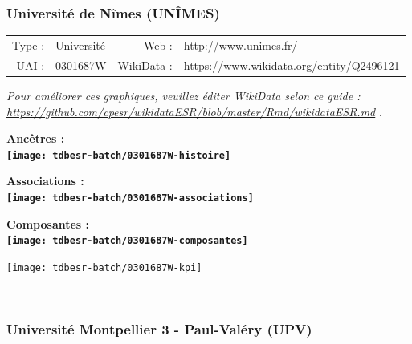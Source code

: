 \documentclass[12pt,french,]{article}
\begin{document}
\hypertarget{universituxe9-de-nuxeemes-unuxeemes}{%
\subsubsection{Université de Nîmes
(UNÎMES)}\label{universituxe9-de-nuxeemes-unuxeemes}}

\begin{tabular*}{\textwidth}{rp{5cm}rl}  
\hline  
Type : & Université & Web : &\href{http://www.unimes.fr/}{http://www.unimes.fr/} \\  
UAI : & 0301687W & WikiData : & \href{https://www.wikidata.org/entity/Q2496121}{https://www.wikidata.org/entity/Q2496121} \\  
\hline  
\end{tabular*}

\textit{\scriptsize Pour améliorer ces graphiques, veuillez éditer WikiData selon ce guide :  \href{https://github.com/cpesr/wikidataESR/blob/master/Rmd/wikidataESR.md}{https://github.com/cpesr/wikidataESR/blob/master/Rmd/wikidataESR.md}}
.

\vspace{1cm}  
\begin{minipage}[b]{0.50\textwidth}\begin{center} \bf Ancêtres : \\  
\texttt{[image: tdbesr-batch/0301687W-histoire]} \end{center}\end{minipage}\begin{minipage}[b]{0.50\textwidth}\begin{center} \bf Associations : \\  
\texttt{[image: tdbesr-batch/0301687W-associations]} \end{center}\end{minipage}

\hrulefill

\begin{center} \bf Composantes : \\  
\texttt{[image: tdbesr-batch/0301687W-composantes]} \end{center}

\begin{center}\texttt{[image: tdbesr-batch/0301687W-kpi]} \end{center}\checkoddpage

\ifoddpage \fi ~\newpage  

\hypertarget{universituxe9-montpellier-3---paul-valuxe9ry-upv}{%
\subsubsection{Université Montpellier 3 - Paul-Valéry
(UPV)}\label{universituxe9-montpellier-3---paul-valuxe9ry-upv}}
\end{document}
